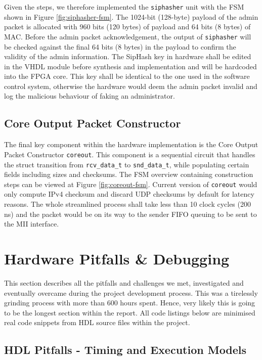 \documentclass[a4paper]{report}
\newcommand{\proglang}{\textsf}
\newcommand{\code}{\texttt}
\begin{document}
Given the steps, we therefore implemented the \code{siphasher} unit with the FSM shown in Figure \ref{fig:siphasher-fsm}. The 1024-bit (128-byte) payload of the admin packet is allocated with 960 bits (120 bytes) of payload and 64 bits (8 bytes) of MAC. Before the admin packet acknowledgement, the output of \code{siphasher} will be checked against the final 64 bits (8 bytes) in the payload to confirm the validity of the admin information. The SipHash key in hardware shall be edited in the \proglang{VHDL} module before synthesis and implementation and will be hardcoded into the FPGA core. This key shall be identical to the one used in the software control system, otherwise the hardware would deem the admin packet invalid and log the malicious behaviour of faking an administrator.

\subsection{Core Output Packet Constructor}

The final key component within the hardware implementation is the Core Output Packet Constructor \code{coreout}. This component is a sequential circuit that handles the struct transition from \code{rcv\_data\_t} to \code{snd\_data\_t}, while populating certain fields including sizes and checksums. The FSM overview containing construction steps can be viewed at Figure \ref{fig:coreout-fsm}. Current version of \code{coreout} would only compute IPv4 checksum and discard UDP checksums by default for latency reasons. The whole streamlined process shall take less than 10 clock cycles (200 ns) and the packet would be on its way to the sender FIFO queuing to be sent to the MII interface.


\section{Hardware Pitfalls \& Debugging}
\label{section:implementation-hardware-debugging}

This section describes all the pitfalls and challenges we met, investigated and eventually overcame during the project development process. This was a tirelessly grinding process with more than 600 hours spent. Hence, very likely this is going to be the longest section within the report. All code listings below are minimised real code snippets from HDL source files within the project. 

\subsection{HDL Pitfalls - Timing and Execution Models}
\end{document}
